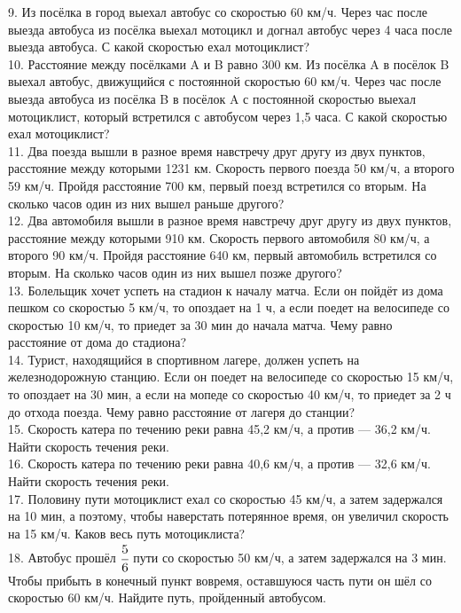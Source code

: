 \documentclass[12pt]{article}
\begin{document}
9. Из посёлка в город выехал автобус со скоростью 60 км/ч. Через час после выезда автобуса из посёлка выехал мотоцикл и догнал автобус через 4 часа после выезда автобуса. С какой скоростью ехал мотоциклист?\\
10. Расстояние между посёлками A и B равно 300 км. Из посёлка A в посёлок B выехал автобус, движущийся с постоянной скоростью 60 км/ч. Через час после выезда автобуса из посёлка B в посёлок A с постоянной скоростью выехал мотоциклист, который встретился с автобусом через 1,5 часа. С какой скоростью ехал мотоциклист?\\
11. Два поезда вышли в разное время навстречу друг другу из двух пунктов, расстояние между которыми 1231 км. Скорость первого поезда 50 км/ч, а второго 59 км/ч. Пройдя расстояние 700 км, первый поезд встретился со вторым. На сколько часов один из них вышел раньше другого?\\
12. Два автомобиля вышли в разное время навстречу друг другу из двух пунктов, расстояние между которыми 910 км. Скорость первого автомобиля 80 км/ч, а второго 90 км/ч. Пройдя расстояние 640 км, первый автомобиль встретился со вторым. На сколько часов один из них вышел позже другого?\\
13. Болельщик хочет успеть на стадион к началу матча. Если он пойдёт из дома пешком со скоростью 5 км/ч, то опоздает на 1 ч, а если поедет на велосипеде со скоростью 10 км/ч, то приедет за 30 мин до начала матча. Чему равно расстояние от дома до стадиона?\\
14. Турист, находящийся в спортивном лагере, должен успеть на железнодорожную станцию. Если он поедет на велосипеде со скоростью 15 км/ч, то опоздает на 30 мин, а если на мопеде со скоростью 40 км/ч, то приедет за 2 ч до отхода поезда. Чему равно расстояние от лагеря до станции?\\
15. Скорость катера по течению реки равна 45,2 км/ч, а против --- 36,2 км/ч. Найти скорость течения реки.\\
16. Скорость катера по течению реки равна 40,6 км/ч, а против --- 32,6 км/ч. Найти скорость течения реки.\\
17. Половину пути мотоциклист ехал со скоростью 45 км/ч, а затем задержался на 10 мин, а поэтому, чтобы наверстать потерянное время, он увеличил скорость на 15 км/ч. Каков весь путь мотоциклиста?\\
18. Автобус прошёл $\cfrac{5}{6}$ пути со скоростью 50 км/ч, а затем задержался на 3 мин. Чтобы прибыть в конечный пункт вовремя, оставшуюся часть пути он шёл со скоростью 60 км/ч. Найдите путь, пройденный автобусом.\\
\end{document}
